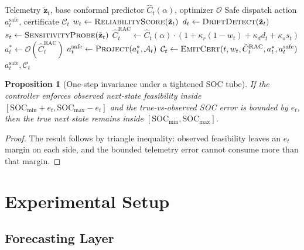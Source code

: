 \documentclass[11pt,a4paper,twocolumn]{article}
\DeclareRobustCommand{\DCThreeS}{DC\textsuperscript{3}S}
\newtheorem{proposition}{Proposition}
\begin{document}
\begin{algorithm}[htbp]
\caption{\DCThreeS{}: One dispatch step}
\label{alg:dc3s}
\begin{algorithmic}[1]
\Require Telemetry $\tilde{\mathbf{z}}_t$, base conformal predictor $\hat{C}_t(\alpha)$, optimizer $\mathcal{O}$
\Ensure Safe dispatch action $a_t^{\text{safe}}$, certificate $\mathcal{C}_t$
\State $w_t \gets \textsc{ReliabilityScore}(\tilde{\mathbf{z}}_t)$ 
\State $d_t \gets \textsc{DriftDetect}(\tilde{\mathbf{z}}_t)$ 
\State $s_t \gets \textsc{SensitivityProbe}(\tilde{\mathbf{z}}_t)$ 
\State $\hat{C}_t^{\text{RAC}} \gets \hat{C}_t(\alpha) \cdot (1 + \kappa_r(1-w_t) + \kappa_d d_t + \kappa_s s_t)$ 
\State $a_t^* \gets \mathcal{O}(\hat{C}_t^{\text{RAC}})$ 
\State $a_t^{\text{safe}} \gets \textsc{Project}(a_t^*, \mathcal{A}_t)$ 
\State $\mathcal{C}_t \gets \textsc{EmitCert}(t, w_t, \hat{C}_t^{\text{RAC}}, a_t^*, a_t^{\text{safe}})$ 
\State \Return $a_t^{\text{safe}}, \mathcal{C}_t$
\end{algorithmic}
\end{algorithm}

\begin{proposition}[One-step invariance under a tightened SOC tube]\label{prop:r1_tightened_tube}
If the controller enforces observed next-state feasibility inside $[\mathrm{SOC}_{\min}+e_t,\mathrm{SOC}_{\max}-e_t]$ and the true-vs-observed SOC error is bounded by $e_t$, then the true next state remains inside $[\mathrm{SOC}_{\min},\mathrm{SOC}_{\max}]$.
\end{proposition}
\begin{proof}
The result follows by triangle inequality: observed feasibility leaves an $e_t$ margin on each side, and the bounded telemetry error cannot consume more than that margin.
\end{proof}

\section{Experimental Setup}\label{sec:experiments}

\subsection{Forecasting Layer}
\end{document}
